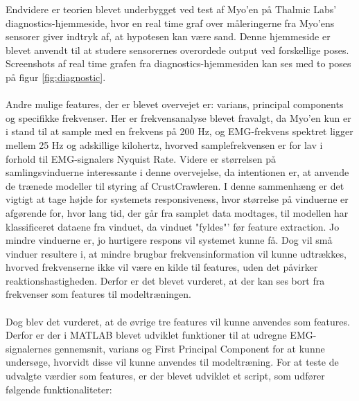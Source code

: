 Endvidere er teorien blevet underbygget ved test af Myo'en på Thalmic Labs' diagnostics-hjemmeside\citep{myoDiagnostik}, hvor en real time graf over måleringerne fra Myo'ens sensorer giver indtryk af, at hypotesen kan være sand. Denne hjemmeside er blevet anvendt til at studere sensorernes overordede output ved forskellige poses. Screenshots af real time grafen fra diagnostics-hjemmesiden kan ses med to poses på figur \ref{fig:diagnostic}.\\\\
Andre mulige features, der er blevet overvejet er: varians, principal components og specifikke frekvenser. Her er frekvensanalyse blevet fravalgt, da Myo'en kun er i stand til at sample med en frekvens på 200 Hz, og EMG-frekvens spektret ligger mellem 25 Hz og adskillige kilohertz\citep{websterEMG}, hvorved samplefrekvensen er for lav i forhold til EMG-signalers Nyquist Rate. Videre er størrelsen på samlingsvinduerne interessante i denne overvejelse, da intentionen er, at anvende de trænede modeller til styring af CrustCrawleren. I denne sammenhæng er det vigtigt at tage højde for systemets responsiveness, hvor størrelse på vinduerne er afgørende for, hvor lang tid, der går fra samplet data modtages, til modellen har klassificeret dataene fra vinduet, da vinduet "fyldes"' før feature extraction. Jo mindre vinduerne er, jo hurtigere respons vil systemet kunne få. Dog vil små vinduer resultere i, at mindre brugbar frekvensinformation vil kunne udtrækkes, hvorved frekvenserne ikke vil være en kilde til features, uden det påvirker reaktionshastigheden. Derfor er det blevet vurderet, at der kan ses bort fra frekvenser som features til modeltræningen.\\\\
Dog blev det vurderet, at de øvrige tre features vil kunne anvendes som features. Derfor er der i MATLAB blevet udviklet funktioner til at udregne EMG-signalernes gennemsnit, varians og First Principal Component for at kunne undersøge, hvorvidt disse vil kunne anvendes til modeltræning.  
For at teste de udvalgte værdier som features, er der blevet udviklet et script, som udfører følgende funktionaliteter:
